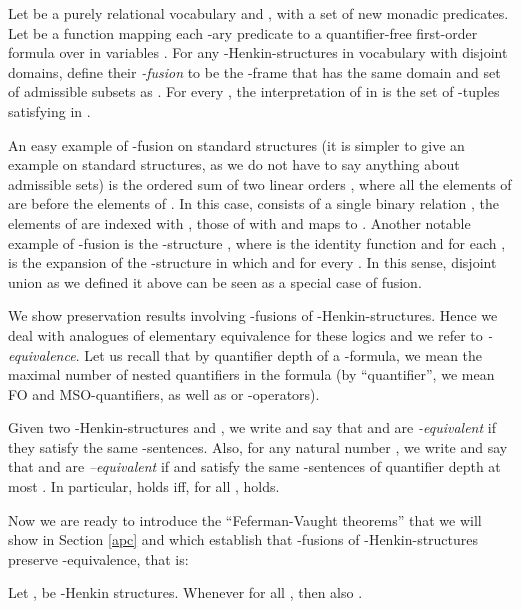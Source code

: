 \documentclass{LMCS}
\newcommand{\fo}{\textsf{FO}\xspace}
\newcommand{\mso}{\textsf{MSO}\xspace}
\begin{document}
\begin{defi}
Let  be a purely relational vocabulary and ,
with  a set of new  monadic predicates.
Let  be a function mapping each -ary predicate  to a quantifier-free first-order formula over  in variables
. For any -Henkin-structures
 in vocabulary  with disjoint domains, define their
\emph{-fusion} to be the -frame  that has the same domain and set of
admissible subsets as .
For every , the interpretation of  in
 is the set of
-tuples satisfying  in
.
\label{fusion}
\end{defi}

An easy example of -fusion on standard structures (it
is simpler to give an example on standard structures, as we do not have to say anything about admissible sets) is
the ordered sum of two linear orders , where
all the elements of  are before the elements of . In
this case,  consists of a single binary relation , the
elements of  are indexed with , those of  with
 and  maps  to . Another notable example of -fusion is the  -structure
, where  is the identity function and for each ,
 is the expansion of the -structure  in which  and   for every . In this sense, disjoint
union as we defined it above can be seen as a special case of fusion.

We show preservation results involving -fusions of
-Henkin-structures. Hence we deal with analogues of
elementary equivalence for these logics and we refer to
\emph{-equivalence}. Let us recall that by quantifier depth of a -formula, we mean the maximal number of nested quantifiers in the formula (by ``quantifier'', we mean \fo and \mso-quantifiers, as well as  or -operators).

\begin{defi}
Given two -Henkin-structures  and , we write
 and say that  and  are
\emph{-equivalent} if they satisfy the same -sentences. Also, for any natural number , we write
 and say that  and  are \emph{--equivalent} if  and  satisfy the same
-sentences of quantifier depth at most . In
particular,  holds iff, for all ,
 holds.
\end{defi}

Now we are ready to introduce the ``Feferman-Vaught theorems'' that we will show in Section \ref{apc} and which establish that -fusions of -Henkin-structures preserve
-equivalence, that is:

\begin{thm}
Let ,  be -Henkin structures. Whenever  for all ,
then also .
\end{thm}
\end{document}
